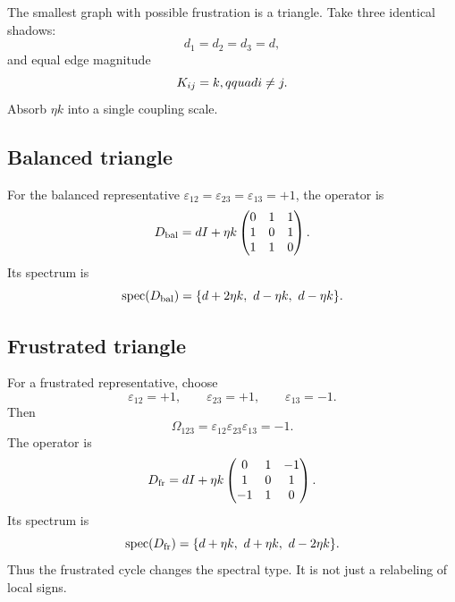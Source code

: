 \documentclass[11pt]{article}
\newcommand{\spec}{\operatorname{spec}}
\begin{document}
The smallest graph with possible frustration is a triangle. Take three identical shadows:
\begin{equation}
 d_1=d_2=d_3=d,
\end{equation}
and equal edge magnitude
\begin{equation}
 K_{ij}=k,\\qquad i\ne j.
\end{equation}
Absorb $\eta k$ into a single coupling scale.

\subsection{Balanced triangle}

For the balanced representative $\varepsilon_{12}=\varepsilon_{23}=\varepsilon_{13}=+1$, the operator is
\begin{equation}
 D_{\rm bal}=dI+\eta k
 \begin{pmatrix}
 0&1&1\\
 1&0&1\\
 1&1&0
 \end{pmatrix}.
\end{equation}
Its spectrum is
\begin{equation}
 \spec(D_{\rm bal})=\{d+2\eta k,\ d-\eta k,\ d-\eta k\}.
\end{equation}

\subsection{Frustrated triangle}

For a frustrated representative, choose
\begin{equation}
 \varepsilon_{12}=+1,\qquad \varepsilon_{23}=+1,\qquad \varepsilon_{13}=-1.
\end{equation}
Then
\begin{equation}
 \Omega_{123}=\varepsilon_{12}\varepsilon_{23}\varepsilon_{13}=-1.
\end{equation}
The operator is
\begin{equation}
 D_{\rm fr}=dI+\eta k
 \begin{pmatrix}
 0&1&-1\\
 1&0&1\\
 -1&1&0
 \end{pmatrix}.
\end{equation}
Its spectrum is
\begin{equation}
 \spec(D_{\rm fr})=\{d+\eta k,\ d+\eta k,\ d-2\eta k\}.
\end{equation}
Thus the frustrated cycle changes the spectral type. It is not just a relabeling of local signs.
\end{document}
